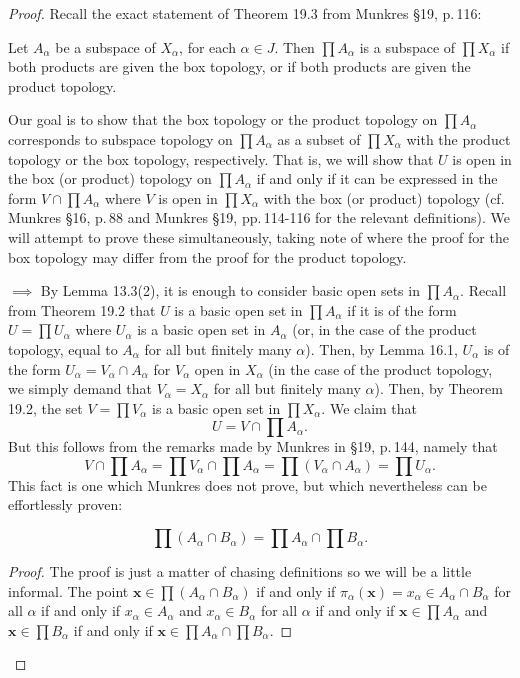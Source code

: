 \begin{proof}
Recall the exact statement of Theorem 19.3 from Munkres \S19,
p.\,116:
\begin{theorem*}
Let $A_\alpha$ be a subspace of $X_\alpha$, for each $\alpha\in
J$. Then $\prod A_\alpha$ is a subspace of $\prod X_\alpha$ if
both products are given the box topology, or if both products are
given the product topology.
\end{theorem*}
Our goal is to show that the box topology or the product topology
on $\prod A_\alpha$ corresponds to subspace topology on $\prod
A_\alpha$ as a subset of $\prod X_\alpha$ with the
product topology or the box topology, respectively. That is, we
will show that $U$ is open in the box (or product) topology on
$\prod A_\alpha$ if and only if it can be expressed in the form
$V\cap\prod A_\alpha$ where $V$ is open in $\prod X_\alpha$ with
the box (or product) topology (cf.\,Munkres \S16, p.\,88 and
Munkres \S19, pp.\,114-116 for the relevant definitions). We will
attempt to prove these simultaneously, taking note of where the
proof for the box topology may differ from the proof for the
product topology.

$\implies$ By Lemma 13.3(2), it is enough to consider basic open
sets in $\prod A_\alpha$. Recall from Theorem 19.2 that $U$ is a
basic open set in $\prod A_\alpha$ if it is of the form $U=\prod
U_\alpha$ where $U_\alpha$ is a basic open set in $A_\alpha$ (or,
in the case of the product topology, equal to $A_\alpha$ for all
but finitely many $\alpha$). Then, by Lemma 16.1, $U_\alpha$ is
of the form $U_\alpha=V_\alpha\cap A_\alpha$ for $V_\alpha$ open
in $X_\alpha$ (in the case of the product topology, we simply
demand that $V_\alpha=X_\alpha$ for all but finitely many
$\alpha$). Then, by Theorem 19.2, the set $V=\prod V_\alpha$ is a
basic open set in $\prod X_\alpha$. We claim that
\[
U=V\cap\prod A_\alpha.
\]
But this follows from the remarks made by Munkres in \S19,
p.\,144, namely that
\[
V\cap\prod A_\alpha=\prod V_\alpha\cap\prod
A_\alpha=\prod\left(V_\alpha\cap A_\alpha\right)=\prod U_\alpha.
\]
This fact is one which Munkres does not prove, but which
nevertheless can be effortlessly proven:
\begin{lemma}
\[\prod\left(A_\alpha\cap B_\alpha\right)=\prod
  A_\alpha\cap\prod B_\alpha.\]
\end{lemma}
\begin{proof}
\renewcommand\qedsymbol{$\clubsuit$}
The proof is just a matter of chasing definitions so we will be a
little informal. The point $\mathbf{x}\in\prod\left(A_\alpha\cap
  B_\alpha\right)$ if and only if
$\pi_\alpha(\mathbf{x})=x_\alpha\in A_\alpha\cap B_\alpha$ for
all $\alpha$ if and only if $x_\alpha\in A_\alpha$ and
$x_\alpha\in B_\alpha$ for all $\alpha$ if and only if
$\mathbf{x}\in\prod A_\alpha$ and $\mathbf{x}\in\prod B_\alpha$
if and only if $\mathbf{x}\in\prod A_\alpha\cap\prod B_\alpha$.
 \end{proof}


\end{proof}
